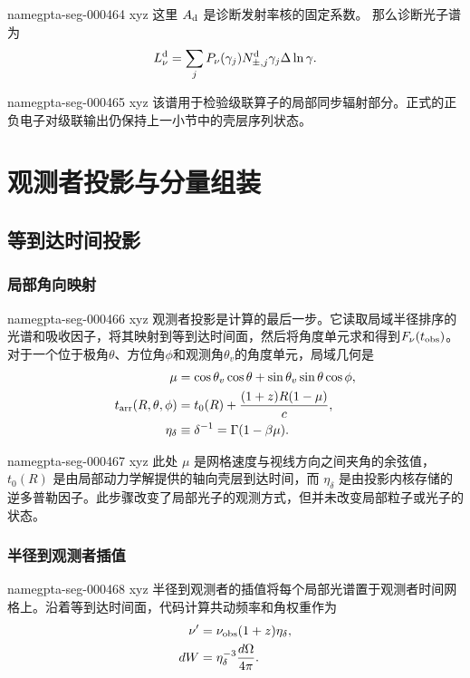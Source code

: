 \documentclass[twocolumn]{aastex702}
\makeatletter
\providecommand{\gptareaderanchor}[1]{\pdfdest name{#1} xyz}%
\providecommand{\gptareaderanchor}[1]{\special{pdf:dest (#1) [ @thispage /XYZ @xpos @ypos null ]}}%
\makeatother
\begin{document}
\gptareaderanchor{gpta-seg-000464}%
这里 \(A_{\rm d}\) 是诊断发射率核的固定系数。
那么诊断光子谱为
\begin{equation}
L_\nu^{\rm d}
=
\sum_j P_\nu(\gamma_j)N_{\pm,j}^{\rm d}\gamma_j\Delta\ln\gamma .
\end{equation}

\gptareaderanchor{gpta-seg-000465}%
该谱用于检验级联算子的局部同步辐射部分。正式的正负电子对级联输出仍保持上一小节中的壳层序列状态。

\section{观测者投影与分量组装} \label{sec:projection}

\subsection{等到达时间投影}

\subsubsection{局部角向映射}


\gptareaderanchor{gpta-seg-000466}%
观测者投影是计算的最后一步。它读取局域半径排序的光谱和吸收因子，将其映射到等到达时间面，然后将角度单元求和得到\(F_\nu(t_{\rm obs})\)。对于一个位于极角\(\theta\)、方位角\(\phi\)和观测角\(\theta_v\)的角度单元，局域几何是
\begin{equation}
\begin{aligned}
\mu&=\cos\theta_v\cos\theta+\sin\theta_v\sin\theta\cos\phi,\\
t_{\rm arr}(R,\theta,\phi)
&=t_0(R)+\frac{(1+z)R(1-\mu)}{c},\\
\eta_\delta&\equiv\delta^{-1}=\Gamma(1-\beta\mu).
\end{aligned}
\end{equation}

\gptareaderanchor{gpta-seg-000467}%
此处 \(\mu\) 是网格速度与视线方向之间夹角的余弦值，\(t_0(R)\) 是由局部动力学解提供的轴向壳层到达时间，而 \(\eta_\delta\) 是由投影内核存储的逆多普勒因子。此步骤改变了局部光子的观测方式，但并未改变局部粒子或光子的状态。

\subsubsection{半径到观测者插值}


\gptareaderanchor{gpta-seg-000468}%
半径到观测者的插值将每个局部光谱置于观测者时间网格上。沿着等到达时间面，代码计算共动频率和角权重作为
\begin{equation}
\begin{aligned}
\nu'&=\nu_{\rm obs}(1+z)\eta_\delta,\\
dW&=\eta_\delta^{-3}\frac{d\Omega}{4\pi}.
\end{aligned}
\end{equation}
\end{document}
